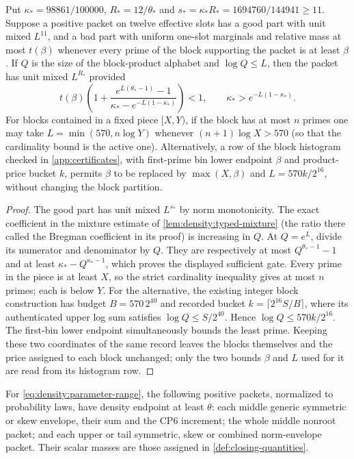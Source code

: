 \begin{lemma}\label{lem:density:joint-block-gate}
Put $\kappa_*=98861/100000$, $R_*=12/\theta_*$ and
$s_*=\kappa_*R_*=1694760/144941\ge11$. Suppose a positive packet
on twelve effective slots has a good part with unit mixed $L^{11}$,
and a bad part with uniform one-slot marginals and relative mass at most $t(\beta)$ whenever every prime of the block supporting the packet is at least $\beta$. If $Q$ is the size of the block-product alphabet and $\log Q\le L$, then the packet
has unit mixed $L^{R_*}$ provided
\begin{equation}\label{eq:density:joint-block-gate}
 t(\beta)\left(1+
 \frac{e^{L(\theta_*-1)}-1}
      {\kappa_*-e^{-L(1-\kappa_*)}}\right)<1,
 \qquad \kappa_*>e^{-L(1-\kappa_*)}.
\end{equation}
For blocks contained in a fixed piece $[X,Y)$, if the block
has at most $n$ primes one may take $L=\min(570,n\log Y)$
whenever $(n+1)\log X>570$ (so that the cardinality bound is the
active one).
Alternatively, a row of the block histogram checked in
\cref{app:certificates}, with first-prime bin lower endpoint
$\beta$ and product-price bucket $k$, permits
$\beta$ to be replaced by $\max(X,\beta)$ and
$L=570k/2^{16}$, without changing the block partition.
\end{lemma}
\begin{proof}
The good part has unit mixed $L^{s_*}$ by norm monotonicity.
The exact coefficient in the mixture estimate of
\cref{lem:density:typed-mixture} (the ratio there called the
Bregman coefficient in its proof) is increasing in $Q$. At $Q=e^L$, divide its numerator and
denominator by $Q$. They are respectively at most
$Q^{\theta_*-1}-1$ and at least
$\kappa_*-Q^{\kappa_*-1}$, which proves the displayed sufficient gate.
Every prime in the piece is at least $X$, so the strict cardinality
inequality gives at most $n$ primes; each is below $Y$.
For the alternative, the existing integer block construction has
budget $B=570\,2^{40}$ and recorded bucket
$k=\lceil2^{16}S/B\rceil$, where its authenticated upper log sum
satisfies $\log Q\le S/2^{40}$. Hence
$\log Q\le570k/2^{16}$. The first-bin lower endpoint simultaneously
bounds the least prime. Keeping these two coordinates of the same record leaves the blocks themselves and the price assigned to each block unchanged; only the two bounds $\beta$ and $L$ used for it are read from its histogram row.
\end{proof}

\begin{lemma}\label{lem:density:packets}
For \eqref{eq:density:parameter-range}, the following positive packets, normalized to probability laws, have density endpoint at least $\theta$: each middle generic symmetric
or skew envelope, their sum and the CP6 increment; the whole middle
nonroot packet; and each upper or tail symmetric, skew or combined
norm-envelope packet. Their scalar masses are those assigned in \cref{def:closing-quantities}.
\end{lemma}

